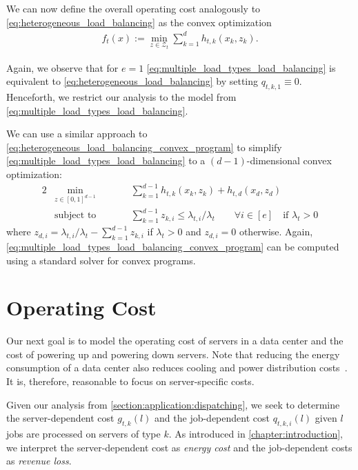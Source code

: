 We can now define the overall operating cost analogously to \cref{eq:heterogeneous_load_balancing} as the convex optimization \begin{align}\label{eq:multiple_load_types_load_balancing}
    f_t(x) := \min_{z \in \mathcal{Z}_t} \sum_{k=1}^d h_{t,k}(x_k,z_k).
\end{align}

Again, we observe that for $e = 1$ \cref{eq:multiple_load_types_load_balancing} is equivalent to \cref{eq:heterogeneous_load_balancing} by setting $q_{t,k,1} \equiv 0$. Henceforth, we restrict our analysis to the model from \cref{eq:multiple_load_types_load_balancing}.

We can use a similar approach to \cref{eq:heterogeneous_load_balancing_convex_program} to simplify \cref{eq:multiple_load_types_load_balancing} to a $(d-1)$-dimensional convex optimization: \begin{alignat}{2}\label{eq:multiple_load_types_load_balancing_convex_program}
    &\min_{z \in [0,1]^{d-1}} &\qquad&\sum_{k=1}^{d-1} h_{t,k}(x_k,z_k) + h_{t,d}(x_d,z_d) \\
    &\textrm{subject to}  &      &\sum_{k=1}^{d-1} z_{k,i} \leq \lambda_{t,i} / \lambda_t \qquad\forall i \in [e]\quad\text{if }\lambda_t > 0 \nonumber
\end{alignat} where $z_{d,i} = \lambda_{t,i} / \lambda_t - \sum_{k=1}^{d-1} z_{k,i}$ if $\lambda_t > 0$ and $z_{d,i} = 0$ otherwise. Again, \cref{eq:multiple_load_types_load_balancing_convex_program} can be computed using a standard solver for convex programs.

\section{Operating Cost}\label{section:application:operating_cost}

Our next goal is to model the operating cost of servers in a data center and the cost of powering up and powering down servers. Note that reducing the energy consumption of a data center also reduces cooling and power distribution costs~\cite{Lin2011, Clark2005}. It is, therefore, reasonable to focus on server-specific costs.

Given our analysis from \cref{section:application:dispatching}, we seek to determine the server-dependent cost $g_{t,k}(l)$ and the job-dependent cost $q_{t,k,i}(l)$ given $l$ jobs are processed on servers of type $k$. As introduced in \cref{chapter:introduction}, we interpret the server-dependent cost as \emph{energy cost} and the job-dependent costs as \emph{revenue loss}.

